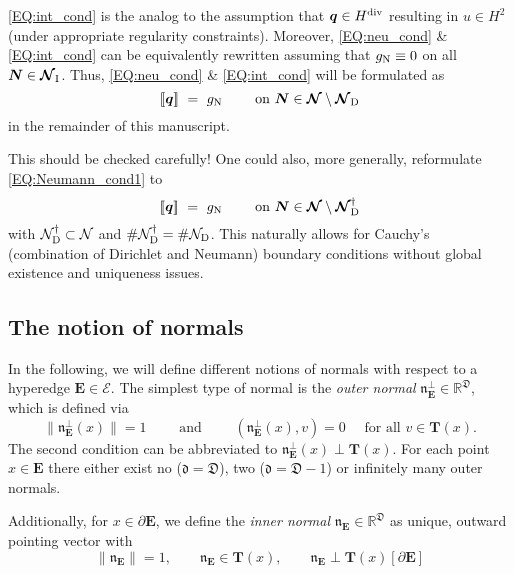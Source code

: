 \documentclass[a4paper, english, 12pt, reqno, draft]{amsart}
\theoremstyle{definition}
\theoremstyle{remark}
\numberwithin{equation}{section}
\newcommand{\setNode}{\ensuremath{\mathcal N}}
\newcommand{\setNodeDir}{\ensuremath{\setNode_\textup D}}
\newcommand{\SetEdge}{\ensuremath{\boldsymbol{\mathcal E}}}
\newcommand{\SetNode}{\ensuremath{\boldsymbol{\mathcal N}}}
\newcommand{\SetNodeDir}{\ensuremath{\SetNode_\textup D}}
\newcommand{\SetNodeInt}{\ensuremath{\SetNode_\textup I}}
\newcommand{\Edge}{{\ensuremath{\boldsymbol E}}}
\newcommand{\Node}{{\ensuremath{\boldsymbol N}}}
\newcommand{\locDim}{\ensuremath{\mathfrak d}}
\newcommand{\globDim}{\ensuremath{\mathfrak D}}
\newcommand{\tangent}{\ensuremath{{\boldsymbol T}}}
\newcommand{\Normal}{\ensuremath{\mathfrak n_\Edge}}
\newcommand{\NormalOuter}{\ensuremath{\mathfrak n^\perp_\Edge}}
\newcommand{\jump}[1]{{[\![ #1 ]\!]}}
\newcommand{\IR}{\ensuremath{\mathbb R}}
\renewcommand{\vec}[1]{\ensuremath{\boldsymbol{#1}}}
\begin{document}
\eqref{EQ:int_cond} is the analog to the assumption that $\vec q \in H^\textup{div}$ resulting in $u \in H^2$ (under appropriate regularity constraints). Moreover, \eqref{EQ:neu_cond} \& \eqref{EQ:int_cond} can be equivalently rewritten assuming that $g_\text N \equiv 0$ on all $\Node \in \SetNodeInt$. Thus, \eqref{EQ:neu_cond} \& \eqref{EQ:int_cond} will be formulated as
% 
\begin{equation}\label{EQ:Neumann_cond1}
 \jump{\vec q} ~=~ g_\textup N \qquad \text{ on } \Node \in \SetNode \setminus \SetNodeDir
\end{equation}
% 
in the remainder of this manuscript.
% 
\begin{envarerror}{This should be checked carefully!}
% 
One could also, more generally, reformulate \eqref{EQ:Neumann_cond1} to
% 
\begin{equation}
 \jump{\vec q} ~=~ g_\textup N \qquad \text{ on } \Node \in \SetNode \setminus \SetNodeDir^\dagger
\end{equation}
% 
with $\setNodeDir^\dagger \subset \setNode$ and $\# \setNodeDir^\dagger = \# \setNodeDir$. This naturally allows for Cauchy's (combination of Dirichlet and Neumann) boundary conditions without global existence and uniqueness issues.
% 
\end{envarerror}
% 
\subsection{The notion of normals}\label{SEC:normals}
% 
In the following, we will define different notions of normals with respect to a hyperedge $\Edge \in \SetEdge$. The simplest type of normal is the \emph{outer normal} $\NormalOuter \in \IR^\globDim$, which is defined via
% 
\begin{equation*}
 \|\NormalOuter(x)\| = 1 \qquad \text{ and } \qquad (\NormalOuter(x), v) = 0 \quad \text{ for all } v \in \tangent(x).
\end{equation*}
% 
The second condition can be abbreviated to $\NormalOuter(x) \perp \tangent(x)$. For each point $x \in \Edge$ there either exist no ($\locDim = \globDim$), two ($\locDim = \globDim - 1$) or infinitely many outer normals.

Additionally, for $x \in \partial \Edge$, we define the \emph{inner normal} $\Normal \in \IR^\globDim$ as unique, outward pointing vector with
%
\begin{equation}\label{EQ:inner_const}
 \| \Normal \| = 1, \qquad \Normal \in \tangent(x), \qquad \Normal \perp \tangent(x) [\partial \Edge]
\end{equation}
\end{document}
